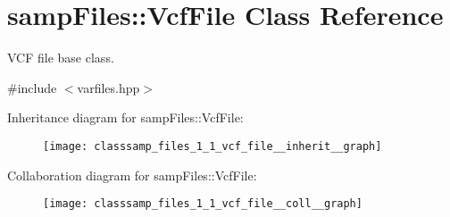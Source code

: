 \hypertarget{classsamp_files_1_1_vcf_file}{}\section{samp\+Files\+:\+:Vcf\+File Class Reference}
\label{classsamp_files_1_1_vcf_file}


V\+CF file base class.  




{\ttfamily \#include $<$varfiles.\+hpp$>$}



Inheritance diagram for samp\+Files\+:\+:Vcf\+File\+:\nopagebreak
\begin{figure}[H]
\begin{center}
\leavevmode
\texttt{[image: classsamp\_files\_1\_1\_vcf\_file\_\_inherit\_\_graph]}
\end{center}
\end{figure}


Collaboration diagram for samp\+Files\+:\+:Vcf\+File\+:\nopagebreak
\begin{figure}[H]
\begin{center}
\leavevmode
\texttt{[image: classsamp\_files\_1\_1\_vcf\_file\_\_coll\_\_graph]}
\end{center}
\end{figure}

